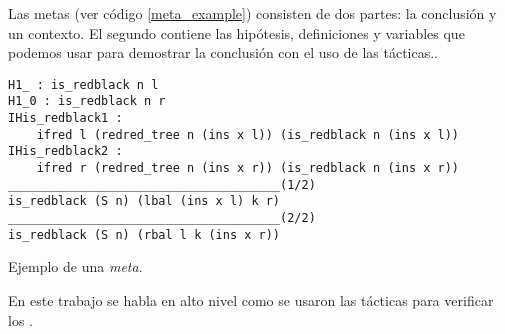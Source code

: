 Las metas (ver c\'odigo \ref{meta_example}) consisten de dos partes: la conclusi\'on y un contexto. El segundo contiene las hip\'otesis, definiciones y variables que podemos 
usar para demostrar la conclusi\'on con el uso de las t\'acticas.\cite{GOALS}. 
\begin{listing}[!ht]
\centering
\captionsetup{justification=centering}
\begin{verbatim}
H1_ : is_redblack n l
H1_0 : is_redblack n r
IHis_redblack1 :
    ifred l (redred_tree n (ins x l)) (is_redblack n (ins x l))
IHis_redblack2 :
    ifred r (redred_tree n (ins x r)) (is_redblack n (ins x r))
______________________________________(1/2)
is_redblack (S n) (lbal (ins x l) k r)
______________________________________(2/2)
is_redblack (S n) (rbal l k (ins x r))
\end{verbatim}
\caption{Ejemplo de una \textit{meta}.}
\label{meta_example}
\end{listing}
En este trabajo se habla en alto nivel como se usaron las t\'acticas para verificar los {\arns}.



